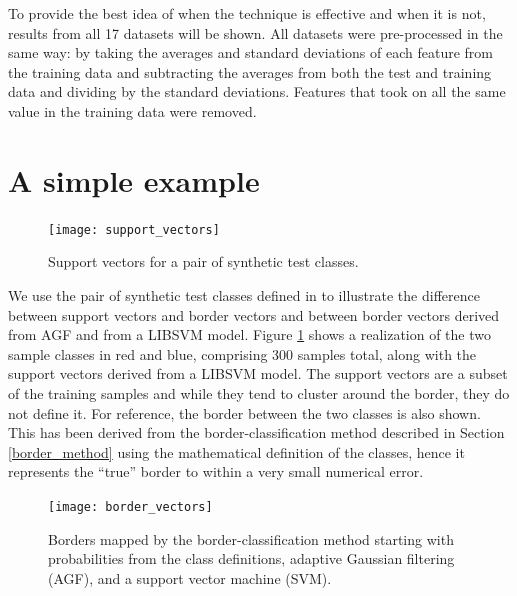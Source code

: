 To provide the best idea of when the technique is effective and when it is
not, results from all 17 datasets will be shown. 
All datasets were pre-processed in the same way: by taking the averages and
standard deviations of each feature from the training data and subtracting
the averages from both the test and training data and dividing by the 
standard deviations.
Features that took on all the same value in the training data were removed.


\section{A simple example}

\label{example}

\begin{figure}
\texttt{[image: support\_vectors]}
\caption{Support vectors for a pair of synthetic test classes.}\label{sample_sv}
\end{figure}

We use the pair of synthetic test classes defined in \citet{Mills2011} to 
illustrate the difference between support vectors and border vectors and 
between border vectors derived from AGF and from a LIBSVM model.
Figure \ref{sample_sv} shows a realization of the two sample classes 
in red and blue, comprising 300 samples total, along
with the support vectors derived from a LIBSVM model.
The support vectors are a subset of the training samples and while they
tend to cluster around the border, they do not define it.
For reference, the border between the two classes is also shown.
This has been derived from the border-classification method described in 
Section \ref{border_method} using the mathematical definition of the classes,
hence it represents the ``true'' border to within a very small numerical error.

\begin{figure}
\texttt{[image: border\_vectors]}
\caption{Borders mapped by the border-classification method starting with probabilities from the class definitions, adaptive Gaussian filtering (AGF), and a support vector machine (SVM).}
\label{border_vectors}
\end{figure}

